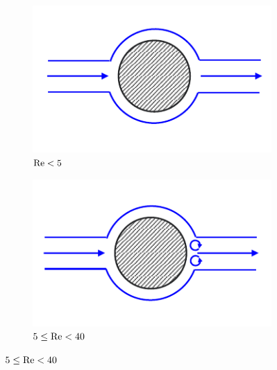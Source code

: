 \documentclass[oneside]{utmthesis}
\begin{document}
\begin{figure}[!h]
  \hspace{1.3cm}
  \begin{subfigure}[h]{0.25\textwidth}
    \includegraphics[width=\textwidth]{figs/karmanVortex0-5}
    \caption{$\text{Re} < 5$}
    \label{fig:kv05}
  \end{subfigure}
  \hspace{4cm}
  \begin{subfigure}[h]{0.25\textwidth}
    \includegraphics[width=\textwidth]{figs/karmanVortex5-40}
    \caption{$5 \leq \text{Re} < 40$}
    \label{fig:kv540}
  \end{subfigure}


\end{figure}
\end{document}
